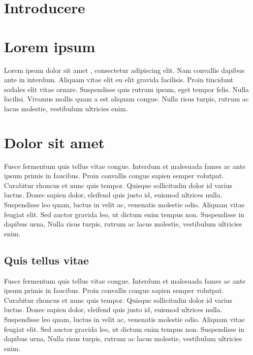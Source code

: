 \section{Introducere}

\section{Lorem ipsum}

Lorem ipsum dolor sit amet \cite{fake_citation}, consectetur adipiscing elit.
Nam convallis dapibus ante in interdum. Aliquam vitae elit eu elit gravida
facilisis. Proin tincidunt sodales elit vitae ornare. Suspendisse quis rutrum
ipsum, eget tempor felis. Nulla facilisi. Vivamus mollis quam a est aliquam congue.
Nulla risus turpis, rutrum ac lacus molestie, vestibulum ultricies enim.

\section{Dolor sit amet}

Fusce fermentum quis tellus vitae congue. Interdum et malesuada fames ac ante ipsum
primis in faucibus. Proin convallis congue sapien semper volutpat. Curabitur rhoncus
et nunc quis tempor. Quisque sollicitudin dolor id varius luctus.
Donec sapien dolor, eleifend quis justo id, euismod ultrices nulla. Suspendisse leo
quam, luctus in velit ac, venenatis molestie odio. Aliquam vitae feugiat elit.
Sed auctor gravida leo, ut dictum enim tempus non. Suspendisse in dapibus urna,
Nulla risus turpis, rutrum ac lacus molestie, vestibulum ultricies enim.

\subsection{Quis tellus vitae}

Fusce fermentum quis tellus vitae congue. Interdum et malesuada fames ac ante ipsum
primis in faucibus. Proin convallis congue sapien semper volutpat. Curabitur rhoncus
et nunc quis tempor. Quisque sollicitudin dolor id varius luctus.
Donec sapien dolor, eleifend quis justo id, euismod ultrices nulla. Suspendisse leo
quam, luctus in velit ac, venenatis molestie odio. Aliquam vitae feugiat elit.
Sed auctor gravida leo, ut dictum enim tempus non. Suspendisse in dapibus urna,
Nulla risus turpis, rutrum ac lacus molestie, vestibulum ultricies enim.
